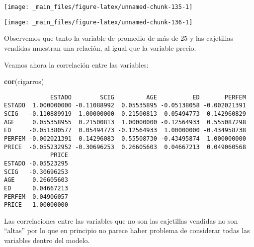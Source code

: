 \documentclass[
  a4paper,
  oneside,
  openany]{book}
\newenvironment{Shaded}{\begin{snugshade}}{\end{snugshade}}
\newcommand{\DataTypeTok}[1]{\textcolor[rgb]{0.13,0.29,0.53}{#1}}
\newcommand{\DecValTok}[1]{\textcolor[rgb]{0.00,0.00,0.81}{#1}}
\newcommand{\KeywordTok}[1]{\textcolor[rgb]{0.13,0.29,0.53}{\textbf{#1}}}
\newcommand{\NormalTok}[1]{#1}
\newcommand{\OperatorTok}[1]{\textcolor[rgb]{0.81,0.36,0.00}{\textbf{#1}}}
\newcommand{\StringTok}[1]{\textcolor[rgb]{0.31,0.60,0.02}{#1}}
\begin{document}
\begin{center}\texttt{[image: \_main\_files/figure-latex/unnamed-chunk-135-1]} \end{center}

\begin{Shaded}
\end{Shaded}

\begin{center}\texttt{[image: \_main\_files/figure-latex/unnamed-chunk-136-1]} \end{center}

Observemos que tanto la variable de promedio de más de 25 y las cajetillas vendidas muestran una relación, al igual que la variable precio.

Veamos ahora la correlación entre las variables:

\begin{Shaded}
\begin{Highlighting}[]
\KeywordTok{cor}\NormalTok{(cigarros)}
\end{Highlighting}
\end{Shaded}

\begin{verbatim}
             ESTADO        SCIG         AGE          ED       PERFEM
ESTADO  1.000000000 -0.11088992  0.05535895 -0.05138058 -0.002021391
SCIG   -0.110889919  1.00000000  0.21500813  0.05494773  0.142960829
AGE     0.055358955  0.21500813  1.00000000 -0.12564933  0.555087298
ED     -0.051380577  0.05494773 -0.12564933  1.00000000 -0.434958738
PERFEM -0.002021391  0.14296083  0.55508730 -0.43495874  1.000000000
PRICE  -0.055232952 -0.30696253  0.26605603  0.04667213  0.049060568
             PRICE
ESTADO -0.05523295
SCIG   -0.30696253
AGE     0.26605603
ED      0.04667213
PERFEM  0.04906057
PRICE   1.00000000
\end{verbatim}

Las correlaciones entre las variables que no son las cajetillas vendidas no son ``altas'' por lo que en principio no parece haber problema de considerar todas las variables dentro del modelo.
\end{document}

